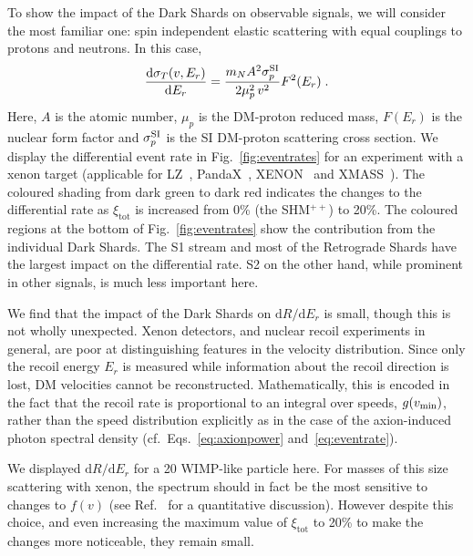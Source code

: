 \documentclass[prd,10pt,twocolumn,showpacs,nofootinbib,aps,superscriptaddress,preprintnumbers]{revtex4-1}
\newcommand{\eV}{\text{e\kern-0.15ex V}\xspace}
\newcommand{\GeV}{\text{G\eV}\xspace}
\newcommand{\SHMpp}{SHM$^{++}$\xspace}
\begin{document}
  To show the impact of the Dark Shards on observable signals, we will
  consider the most familiar one: spin independent elastic scattering with equal
  couplings to protons and neutrons. In this case,
  \begin{equation}
  \frac{\mathrm{d} \sigma_T (v,E_r)}{\mathrm{d} E_r} = \frac{m_N A^2 \sigma_p^{\rm{SI}}}{2 \mu_p^2\,v^2} F^2(E_r)\;.
  \end{equation}
  Here, $A$ is the atomic number, $\mu_p$ is the DM-proton reduced mass,
  $F(E_r)$ is the nuclear form factor and $\sigma_p^{\rm{SI}}$ is the SI
  DM-proton scattering cross section.  We display the differential event
  rate in Fig.~\ref{fig:eventrates} for an experiment with a xenon
  target (applicable for LZ~\citep{Akerib:2018lyp},
  PandaX~\cite{Tan:2016zwf}, XENON~\citep{Aprile:2018dbl} and XMASS~\cite{Abe:2013tc,Suzuki:2018xek}).  The coloured shading from dark green to dark red
  indicates the changes to the differential rate as $\xi_{\mathrm{tot}}$
  is increased from 0\% (the \SHMpp) to 20\%.  The coloured regions at
  the bottom of Fig.~\ref{fig:eventrates} show the contribution from the
  individual Dark Shards.  The S1 stream and most of the Retrograde
  Shards have the largest impact on the differential rate. S2 on the
  other hand, while prominent in other signals, is much
  less important here.

  We find that the impact of the Dark Shards on
  $\mathrm{d}R/\mathrm{d}E_r$ is small, though this is not wholly
  unexpected. Xenon detectors, and nuclear recoil experiments in
  general, are poor at distinguishing features in the velocity
  distribution. Since only the recoil energy $E_r$ is measured while
  information about the recoil direction is lost, DM velocities cannot
  be reconstructed. Mathematically, this is encoded in the fact that the recoil rate is
  proportional to an integral over speeds, $g(v_{\rm min})$, rather than
  the speed distribution explicitly as in the case of the axion-induced
  photon spectral density (cf.~Eqs.~\eqref{eq:axionpower}
  and~\eqref{eq:eventrate}). 

  We displayed $\mathrm{d}R/\mathrm{d}E_r$ for a 20 \GeV WIMP-like particle
  here. For masses of this size scattering with xenon, the spectrum
  should in fact be the most sensitive to changes to $f(v)$
  (see Ref.~\cite{OHare:2018trr} for a quantitative discussion). However despite
  this choice, and even increasing the maximum value of
  $\xi_{\mathrm{tot}}$ to 20\% to make the changes more noticeable, they
  remain small.
\end{document}
